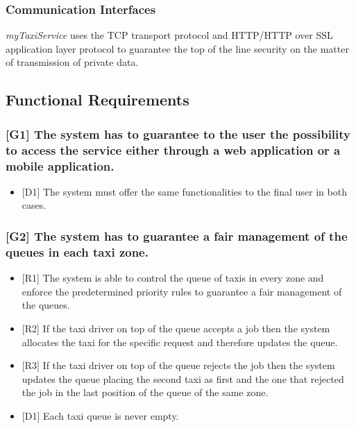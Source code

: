 \documentclass[a4paper,11pt]{report} %
\newcommand{\mts}{\mbox{\normalfont\itshape myTaxiService}}
\begin{document}
	
	\subsubsection{Communication Interfaces} \mts{} uses the TCP transport protocol and HTTP/HTTP over SSL application layer protocol to guarantee the top of the line security on the matter of transmission of private data.
	
	\subsection{Functional Requirements}
	
	\subsubsection{{[}G1{]} The system has to guarantee to the user the possibility to access the service either through a web application or a mobile application.}
	\begin{itemize}
		\item {[}D1{]} The system must offer the same functionalities to the final user in both cases.
	\end{itemize}
	
	\subsubsection{{[}G2{]} The system has to guarantee a fair management of the queues in each taxi zone.}
	\begin{itemize}
		\item {[}R1{]} The system is able to control the queue of taxis in every zone and enforce the predetermined priority rules to guarantee a fair management of the queues.
		\item {[}R2{]} If the taxi driver on top of the queue accepts a job then the system allocates the taxi for the specific request and therefore updates the queue.
		\item {[}R3{]} If the taxi driver on top of the queue rejects the job then the system updates the queue placing the second taxi as first and the one that rejected the job in the last position of the queue of the same zone.
		\item {[}D1{]} Each taxi queue is never empty.
	\end{itemize}
		
\end{document}
